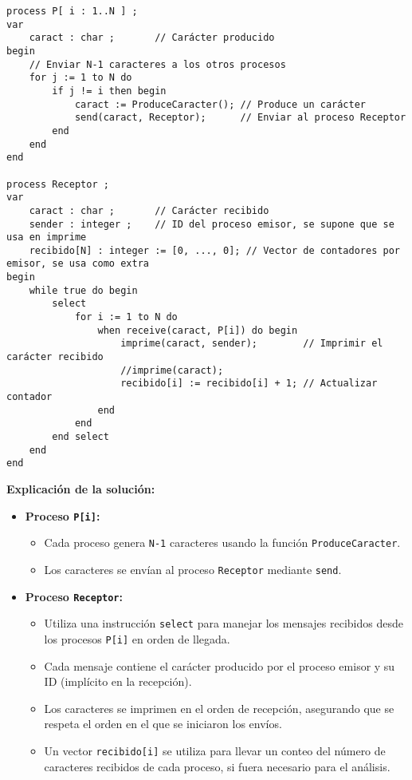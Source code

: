\documentclass[a4paper,12pt]{article}
\begin{document}
\begin{lstlisting}[style=customcpp]
process P[ i : 1..N ] ;
var
    caract : char ;       // Carácter producido
begin
    // Enviar N-1 caracteres a los otros procesos
    for j := 1 to N do
        if j != i then begin
            caract := ProduceCaracter(); // Produce un carácter
            send(caract, Receptor);      // Enviar al proceso Receptor
        end
    end
end

process Receptor ;
var
    caract : char ;       // Carácter recibido
    sender : integer ;    // ID del proceso emisor, se supone que se usa en imprime
    recibido[N] : integer := [0, ..., 0]; // Vector de contadores por emisor, se usa como extra
begin
    while true do begin
        select
            for i := 1 to N do
                when receive(caract, P[i]) do begin
                    imprime(caract, sender);        // Imprimir el carácter recibido
                    //imprime(caract);
                    recibido[i] := recibido[i] + 1; // Actualizar contador
                end
            end
        end select
    end
end
\end{lstlisting}

\textbf{Explicación de la solución:}

\begin{itemize}
    \item \textbf{Proceso \texttt{P[i]}:} 
    \begin{itemize}
        \item Cada proceso genera \texttt{N-1} caracteres usando la función \texttt{ProduceCaracter}.
        \item Los caracteres se envían al proceso \texttt{Receptor} mediante \texttt{send}.
    \end{itemize}
    
    \item \textbf{Proceso \texttt{Receptor}:}
    \begin{itemize}
        \item Utiliza una instrucción \texttt{select} para manejar los mensajes recibidos desde los procesos \texttt{P[i]} en orden de llegada.
        \item Cada mensaje contiene el carácter producido por el proceso emisor y su ID (implícito en la recepción).
        \item Los caracteres se imprimen en el orden de recepción, asegurando que se respeta el orden en el que se iniciaron los envíos.
        \item Un vector \texttt{recibido[i]} se utiliza para llevar un conteo del número de caracteres recibidos de cada proceso, si fuera necesario para el análisis.
    \end{itemize}
\end{itemize}
\end{document}
